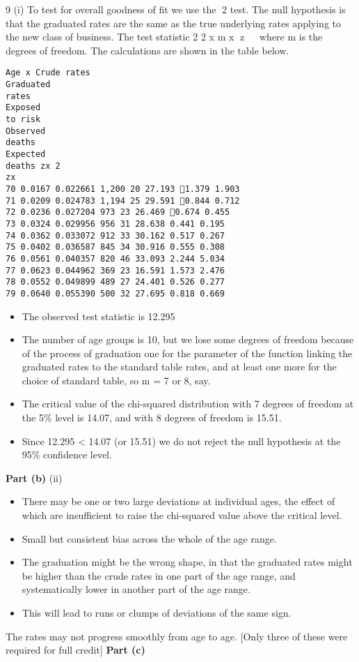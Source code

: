 \documentclass[a4paper,12pt]{article}
\begin{document}
9 (i) To test for overall goodness of fit we use the 2 test.
The null hypothesis is that the graduated rates are the same as the true
underlying rates applying to the new class of business.
The test statistic 2 2
x m
x
z   where m is the degrees of freedom.
The calculations are shown in the table below.
\begin{verbatim}
Age x Crude rates
Graduated
rates
Exposed
to risk
Observed
deaths
Expected
deaths zx 2
zx
70 0.0167 0.022661 1,200 20 27.193 1.379 1.903
71 0.0209 0.024783 1,194 25 29.591 0.844 0.712
72 0.0236 0.027204 973 23 26.469 0.674 0.455
73 0.0324 0.029956 956 31 28.638 0.441 0.195
74 0.0362 0.033072 912 33 30.162 0.517 0.267
75 0.0402 0.036587 845 34 30.916 0.555 0.308
76 0.0561 0.040357 820 46 33.093 2.244 5.034
77 0.0623 0.044962 369 23 16.591 1.573 2.476
78 0.0552 0.049899 489 27 24.401 0.526 0.277
79 0.0640 0.055390 500 32 27.695 0.818 0.669
\end{verbatim}
\begin{itemize}
\item The observed test statistic is 12.295
\item The number of age groups is 10, but we lose some degrees of freedom
because of the process of graduation
one for the parameter of the function linking the graduated rates to the
standard table rates, and at least one more for the choice of standard table, so
m = 7 or 8, say.
\item The critical value of the chi-squared distribution with 7 degrees of
freedom at the 5\% level is 14.07, and with 8 degrees of freedom is 15.51.
\item Since 12.295 < 14.07 (or 15.51)
we do not reject the null hypothesis at the 95\% confidence level. 
\end{itemize}
\newpage
\noindent \textbf{Part (b)}
(ii) 
\begin{itemize}
    \item There may be one or two large deviations at individual ages, the effect of
which are insufficient to raise the chi-squared value above the critical level.
\item Small but consistent bias across the whole of the age range.
\item The graduation might be the wrong shape, in that the graduated rates might be
higher than the crude rates in one part of the age range, and systematically
lower in another part of the age range.
\item This will lead to runs or clumps of
deviations of the same sign.
\end{itemize}
The rates may not progress smoothly from age to age.
[Only three of these were required for full credit] 
\newpage
\noindent \textbf{Part (c)}\\
\end{document}
